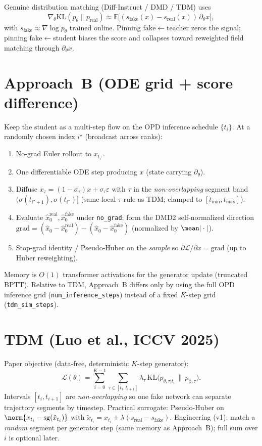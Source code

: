 \documentclass[11pt,a4paper]{article}
\newcommand{\E}{\mathbb{E}}
\newcommand{\KL}{\mathrm{KL}}
\newcommand{\sg}{\mathrm{sg}}
\newcommand{\xh}{\hat{x}_0}
\newcommand{\real}{\mathrm{real}}
\newcommand{\fake}{\mathrm{fake}}
\begin{document}
Genuine distribution matching (Diff-Instruct / DMD / TDM) uses
\[
\nabla_\theta\KL(p_\theta\|p_{\real})
\approx \E\big[(s_{\fake}(x)-s_{\real}(x))\,\partial_\theta x\big],
\]
with $s_{\fake}\approx\nabla\log p_\theta$ trained online. Pinning $\fake\leftarrow$teacher
zeros the signal; pinning $\fake\leftarrow$student biases the score and collapses toward
reweighted field matching through $\partial_\theta x$.

\section{Approach~B (ODE grid + score difference)}

Keep the student as a multi-step flow on the OPD inference schedule $\{t_i\}$.
At a randomly chosen index $i^\star$ (broadcast across ranks):
\begin{enumerate}[leftmargin=1.4em]
\item No-grad Euler rollout to $x_{t_{i^\star}}$.
\item One differentiable ODE step producing $x$ (state carrying $\partial_\theta$).
\item Diffuse $x_\tau=(1-\sigma_\tau)x+\sigma_\tau\varepsilon$ with $\tau$ in the
\emph{non-overlapping} segment band $(\sigma(t_{i^\star+1}),\sigma(t_{i^\star})]$
(same local-$\tau$ rule as TDM; clamped to $[t_{\min},t_{\max}]$).
\item Evaluate $\xh^{\real},\xh^{\fake}$ under \texttt{no\_grad}; form the DMD2
self-normalized direction
$\mathrm{grad}=(\xh-\xh^{\real})-(\xh-\xh^{\fake})$ (normalized by $\mean|\cdot|$).
\item Stop-grad identity / Pseudo-Huber on the \emph{sample} so
$\partial\mathcal{L}/\partial x=\mathrm{grad}$ (up to Huber reweighting).
\end{enumerate}
Memory is $O(1)$ transformer activations for the generator update (truncated BPTT).
Relative to TDM, Approach~B differs only by using the full OPD inference grid
(\texttt{num\_inference\_steps}) instead of a fixed $K$-step grid
(\texttt{tdm\_sim\_steps}).

\section{TDM (Luo et al., ICCV 2025)}

Paper objective (data-free, deterministic $K$-step generator):
\[
\mathcal{L}(\theta)=\sum_{i=0}^{K-1}\sum_{\tau\in[t_i,t_{i+1}]}\lambda_\tau\,
\KL\big(p_{\theta,\tau|t_i}\,\|\,p_{\phi,\tau}\big).
\]
Intervals $[t_i,t_{i+1}]$ are \emph{non-overlapping} so one fake network can separate
trajectory segments by timestep. Practical surrogate: Pseudo-Huber on
$\norm{x_{t_i}-\sg(\tilde x_{t_i})}$ with
$\tilde x_{t_i}=x_{t_i}+\lambda(s_{\real}-s_{\fake})$.
Engineering (v1): match a \emph{random} segment per generator step (same memory as Approach~B);
full sum over $i$ is optional later.
\end{document}
